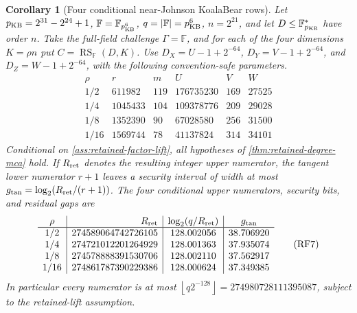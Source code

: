 \documentclass[11pt,a4paper]{amsart}
\numberwithin{equation}{section}
\newtheorem{corollary}[corollary]{Corollary}
\theoremstyle{remark}
\DeclareMathOperator{\RS}{RS}
\newcommand{\F}{\mathbb F}
\newcommand{\abs}[1]{\lvert #1\rvert}
\newcommand{\floor}[1]{\left\lfloor #1\right\rfloor}
\begin{document}
\begin{corollary}[Four conditional near-Johnson KoalaBear rows]
\label{cor:retained-koalabear}
Let
\(p_{\rm KB}=2^{31}-2^{24}+1\),
\(\F=\F_{p_{\rm KB}^6}\), \(q=\abs{\F}=p_{\rm KB}^6\),
\(n=2^{21}\), and let \(D\le\F_{p_{\rm KB}}^*\) have order \(n\).
Take the full-field challenge \(\Gamma=\F\), and for each of the four
dimensions \(K=\rho n\) put \(C=\RS_{\F}(D,K)\).  Use
\(D_X=U-1+2^{-64}\), \(D_Y=V-1+2^{-64}\), and
\(D_Z=W-1+2^{-64}\), with the following convention-safe parameters.
\[
\begin{array}{c|r|r|r|r|r}
\rho&r&m&U&V&W\\ \hline
1/2&611982&119&176735230&169&27525\\
1/4&1045433&104&109378776&209&29028\\
1/8&1352390&90&67028580&256&31500\\
1/16&1569744&78&41137824&314&34101
\end{array}                                        \tag{RF6}
\label{eq:retained-parameters}
\]
Conditional on \cref{ass:retained-factor-lift}, all hypotheses of
\cref{thm:retained-degree-mca} hold.  If \(R_{\rm ret}\) denotes the
resulting integer upper numerator, the tangent lower numerator \(r+1\)
leaves a security interval of width at most
\(g_{\rm tan}=\log_2(R_{\rm ret}/(r+1))\).  The four conditional upper
numerators, security bits, and residual gaps are
\[
\begin{array}{c|r|c|c}
\rho&R_{\rm ret}&\log_2(q/R_{\rm ret})&g_{\rm tan}\\ \hline
1/2&274589064742726105&128.002056&38.706920\\
1/4&274721012201264929&128.001363&37.935074\\
1/8&274578888391530706&128.002110&37.562917\\
1/16&274861787390229386&128.000624&37.349385
\end{array}                                        \tag{RF7}
\label{eq:retained-results}
\]
In particular every numerator is at most
\(\floor{q2^{-128}}=274980728111395087\), subject to the retained-lift
assumption.
\end{corollary}
\end{document}
